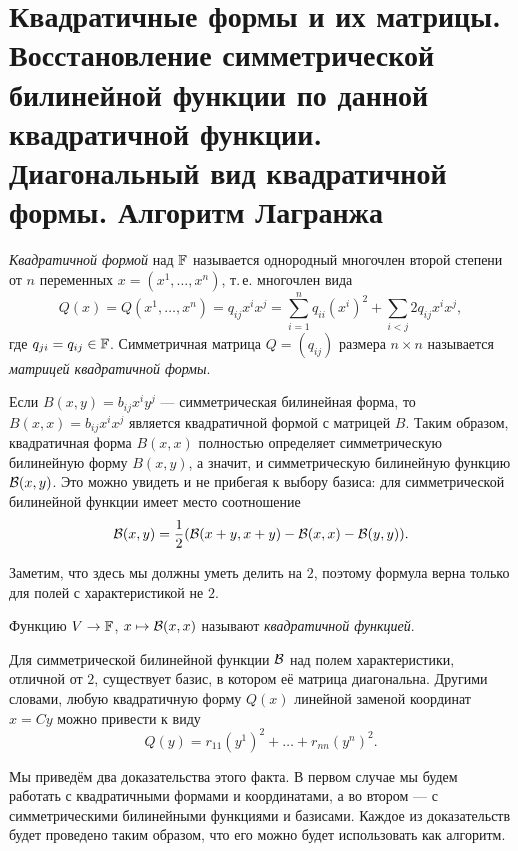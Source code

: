 \section{Квадратичные формы и их матрицы. Восстановление симметрической билинейной функции по данной квадратичной функции. Диагональный вид квадратичной формы. Алгоритм Лагранжа}

\begin{definition}
    \textit{Квадратичной формой} над $\mathbb{F}$ называется однородный многочлен второй степени от $n$ переменных $x = (x^1, \ldots, x^n)$, т.\,е. многочлен вида
    \[
        Q(x) = Q(x^1, \ldots, x^n) = q_{ij}x^ix^j = \sum_{i = 1}^nq_{ii}(x^i)^2 + \sum_{i < j}2q_{ij}x^ix^j,
    \]
    где $q_{ji} = q_{ij} \in \mathbb{F}$. Симметричная матрица $Q = (q_{ij})$ размера $n \times n$ называется \textit{матрицей квадратичной формы}.
\end{definition}

Если $B(x, y) = b_{ij}x^iy^j$ --- симметрическая билинейная форма, то $B(x, x) = b_{ij}x^ix^j$ является квадратичной формой с матрицей $B$. Таким образом, квадратичная форма $B(x, x)$ полностью определяет симметрическую билинейную форму $B(x, y)$, а значит, и симметрическую билинейную функцию $\mathcal{B}(x, y)$. Это можно увидеть и не прибегая к выбору базиса: для симметрической билинейной функции имеет место соотношение
\[
    \mathcal{B}(x, y) = \frac{1}{2}(\mathcal{B}(x + y, x + y) - \mathcal{B}(x, x) - \mathcal{B}(y, y)).
\]

\begin{remark}
    Заметим, что здесь мы должны уметь делить на $2$, поэтому формула верна только для полей с характеристикой не $2$.
\end{remark}

\begin{definition}
    Функцию $V \to \mathbb{F}$, $x \mapsto \mathcal{B}(x, x)$ называют \textit{квадратичной функцией}.
\end{definition}

\begin{theorem}
    Для симметрической билинейной функции $\mathcal{B}$ над полем характеристики, отличной от $2$, существует базис, в котором её матрица диагональна. Другими словами, любую квадратичную форму $Q(x)$ линейной заменой координат $x = Cy$ можно привести к виду
    \[
        Q(y) = r_{11}(y^1)^2 + \ldots + r_{nn}(y^n)^2.
    \]
\end{theorem}

Мы приведём два доказательства этого факта. В первом случае мы будем работать с квадратичными формами и координатами, а во втором --- с симметрическими билинейными функциями и базисами. Каждое из доказательств будет проведено таким образом, что его можно будет использовать как алгоритм.

